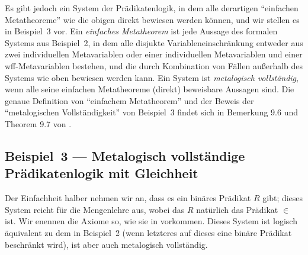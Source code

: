 Es gibt jedoch ein System der Prädikatenlogik, in dem alle derartigen "`einfachen Metatheoreme"' wie die obigen direkt bewiesen werden können, und wir stellen es in Beispiel~3 vor. Ein {\em einfaches Metatheorem} ist jede Aussage des formalen Systems aus Beispiel~2, in dem alle disjukte Variableneinschränkung entweder aus zwei individuellen Metavariablen oder einer individuellen Metavariablen und einer wff-Metavariablen bestehen, und die durch Kombination von Fällen außerhalb des Systems wie oben bewiesen werden kann.  Ein System ist {\em metalogisch vollständig}, wenn alle seine einfachen Metatheoreme (direkt) beweisbare Aussagen sind. Die genaue Definition von "`einfachem Metatheorem"' und der Beweis der "`metalogischen Vollständigkeit"' von Beispiel~3 findet sich in Bemerkung 9.6 und Theorem 9.7 von \cite{Megill}. 

\begin{sloppy}
\subsection{Beispiel~3 --- Metalogisch vollständige Prädikatenlogik mit Gleichheit}
\end{sloppy}

Der Einfachheit halber nehmen wir an, dass es ein binäres Prädikat $R$ gibt; dieses System reicht für die Mengenlehre aus, wobei das $R$ natürlich das Prädikat $\in$ ist.  Wir enennen die Axiome so, wie sie in \cite{Megill} vorkommen.  Dieses System ist logisch äquivalent zu dem in Beispiel~2 (wenn letzteres auf dieses eine binäre Prädikat beschränkt wird), ist aber auch metalogisch vollständig.

